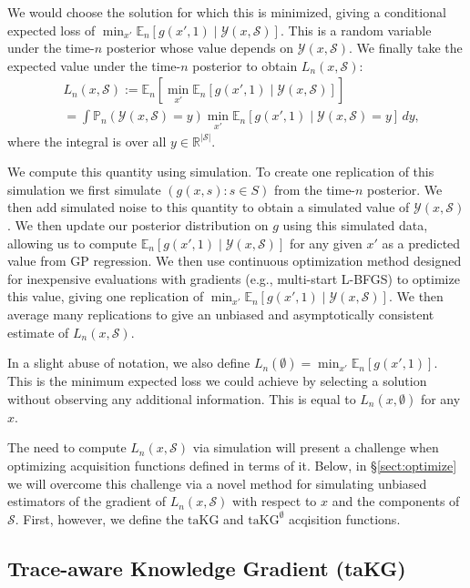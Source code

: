 \documentclass[letterpaper]{article}
\newcommand{\E}{\mathbb{E}}
\newcommand{\taKG}{\text{taKG}}
\newcommand{\taKGE}{\text{taKG}^\emptyset}
\numberwithin{equation}{section}
\let\Section\S
\renewcommand{\S}{\mathcal{S}}
\newcommand{\sectn}[1]{\Section\ref{#1}}
\newcommand{\Y}{\mathcal{Y}}
\newcommand{\loss}{L}
\begin{document}
We would choose the solution for which this is minimized, giving a conditional expected loss of $\min_{x'} \E_n\left[g(x',1) \mid \Y(x,\S) \right]$. This is a random variable under the time-$n$ posterior whose value depends on $\Y(x,\S)$.
We finally take the expected value under the time-$n$ posterior to obtain $\loss_n(x,\S)$:
\begin{equation} 
\begin{split}
&\loss_n(x,\S) := \E_n\left[ \min_{x'} \E_n\left[g(x',1) \mid \Y(x,\S) \right]\right] \\
&\!=\!\int\!\mathbb{P}_n\!\left(\Y(x,\S)\!=\!y\right) \min_{x'} \E_n\left[g(\!x'\!,\!1\!)\!\mid\!\Y(\!x\!,\!\S)\!=\!y \right]\, dy,
\end{split}
\end{equation}
where the integral is over all $y \in \mathbb{R}^{|\S|}$.

We compute this quantity using simulation.  To create one replication of this simulation we first simulate $(g(x,s) : s \in S)$ from the time-$n$ posterior.  We then add simulated noise to this quantity to obtain a simulated value of $\Y(x,\S)$.  We then update our posterior distribution on $g$ using this simulated data, allowing us to compute $\E_n\left[g(x',1) \mid \Y(x,\S)\right]$ for any given $x'$ as a predicted value from GP regression.
We then use continuous optimization method designed for inexpensive evaluations with gradients (e.g., multi-start L-BFGS) to optimize this value, giving one replication of $\min_{x'} \E_n\left[g(x',1) \mid \Y(x,\S)\right]$.  We then average many replications to give an unbiased and asymptotically consistent estimate of $\loss_n(x,\S)$.

In a slight abuse of notation, we also define $\loss_n(\emptyset) = \min_{x'} \E_n\left[g(x',1) \right]$.  This is the minimum expected loss we could achieve by selecting a solution without observing any additional information.
This is equal to $\loss_n(x,\emptyset)$ for any $x$.

The need to compute $\loss_n(x,\S)$ via simulation will present a challenge when optimizing acquisition functions defined in terms of it.  Below, in \sectn{sect:optimize} we will overcome this challenge via a novel method for simulating unbiased estimators of the gradient of $\loss_n(x,\S)$ with respect to $x$ and the components of $\S$.  First, however, we define the $\taKG$ and $\taKGE$ acqisition functions.

\subsection{Trace-aware Knowledge Gradient (taKG)}
\label{sect:voi}
\end{document}

